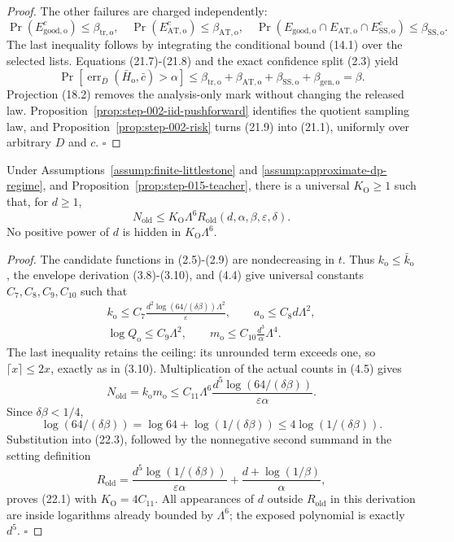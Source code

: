 \begin{proof}
The other failures are charged independently:
\[
\Pr(E_{\mathrm{good,o}}^c)\le\beta_{\mathrm{tr,o}},
\quad
\Pr(E_{\mathrm{AT,o}}^c)\le\beta_{\mathrm{AT,o}},
\quad
\Pr(E_{\mathrm{good,o}}\cap E_{\mathrm{AT,o}}
\cap E_{\mathrm{SS,o}}^c)\le\beta_{\mathrm{SS,o}}.
\tag{21.8}
\]
The last inequality follows by integrating the conditional bound (14.1)
over the selected lists. Equations (21.7)-(21.8) and the exact confidence
split (2.3) yield
\[
\Pr[
\operatorname{err}_{\bar D}(\bar H_{\mathrm o},\bar c)>\alpha]
\le\beta_{\mathrm{tr,o}}+\beta_{\mathrm{AT,o}}
+\beta_{\mathrm{SS,o}}+\beta_{\mathrm{gen,o}}
=\beta.
\tag{21.9}
\]
Projection (18.2) removes the analysis-only mark without changing the
released law. Proposition~\ref{prop:step-002-iid-pushforward}
identifies the quotient sampling law, and Proposition~\ref{prop:step-002-risk} turns (21.9) into (21.1), uniformly
over arbitrary \(D\) and \(c\). \(\square\)


\end{proof}

\begin{proposition}\label{prop:step-015-rate}
Under Assumptions~\ref{assump:finite-littlestone} and
\ref{assump:approximate-dp-regime}, and
Proposition~\ref{prop:step-015-teacher}, there is a universal
\(K_{\mathrm O}\ge1\) such that, for \(d\ge1\),
\[
N_{\mathrm{old}}
\le K_{\mathrm O}\Lambda^6
R_{\mathrm{old}}(d,\alpha,\beta,\varepsilon,\delta).
\tag{22.1}
\]
No positive power of \(d\) is hidden in \(K_{\mathrm O}\Lambda^6\).


\end{proposition}

\begin{proof}
The candidate functions in (2.5)-(2.9) are nondecreasing in \(t\).
Thus \(k_{\mathrm o}\le\bar k_{\mathrm o}\), the envelope derivation
(3.8)-(3.10), and (4.4) give universal constants \(C_7,C_8,C_9,C_{10}\)
such that
\[
\begin{gathered}
k_{\mathrm o}\le
C_7\frac{d^2\log(64/(\delta\beta))\Lambda^2}{\varepsilon},
\qquad
a_{\mathrm o}\le C_8d\Lambda^2,\\
\log Q_{\mathrm o}\le C_9\Lambda^2,\qquad
m_{\mathrm o}\le
C_{10}\frac{d^3}{\alpha}\Lambda^4.
\end{gathered}
\tag{22.2}
\]
The last inequality retains the ceiling: its unrounded term exceeds one,
so \(\lceil x\rceil\le2x\), exactly as in (3.10).
Multiplication of the actual counts in (4.5) gives
\[
N_{\mathrm{old}}=k_{\mathrm o}m_{\mathrm o}
\le C_{11}\Lambda^6
\frac{d^5\log(64/(\delta\beta))}
{\varepsilon\alpha}.
\tag{22.3}
\]
Since \(\delta\beta<1/4\),
\[
\log(64/(\delta\beta))
=\log64+\log(1/(\delta\beta))
\le4\log(1/(\delta\beta)).
\tag{22.4}
\]
Substitution into (22.3), followed by the nonnegative second summand in
the setting definition
\[
R_{\mathrm{old}}
=\frac{d^5\log(1/(\delta\beta))}{\varepsilon\alpha}
+\frac{d+\log(1/\beta)}{\alpha},
\]
proves (22.1) with \(K_{\mathrm O}=4C_{11}\).
All appearances of \(d\) outside \(R_{\mathrm{old}}\) in this derivation
are inside logarithms already bounded by \(\Lambda^6\); the exposed
polynomial is exactly \(d^5\). \(\square\)


\end{proof}

